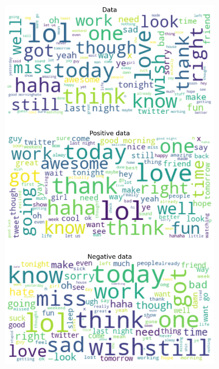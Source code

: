 \documentclass{article}
\begin{document}
\begin{itemize}
\begin{figure}[H]
\begin{subfigure}[b]{0.24\textwidth}
\includegraphics[width=\textwidth]{chapter-06/section-01-01/09/visualization/3/wordcloud.png}
\end{subfigure}
\begin{subfigure}[b]{0.24\textwidth}
\centering

\end{subfigure}
\end{figure}
\end{itemize}
\end{document}
